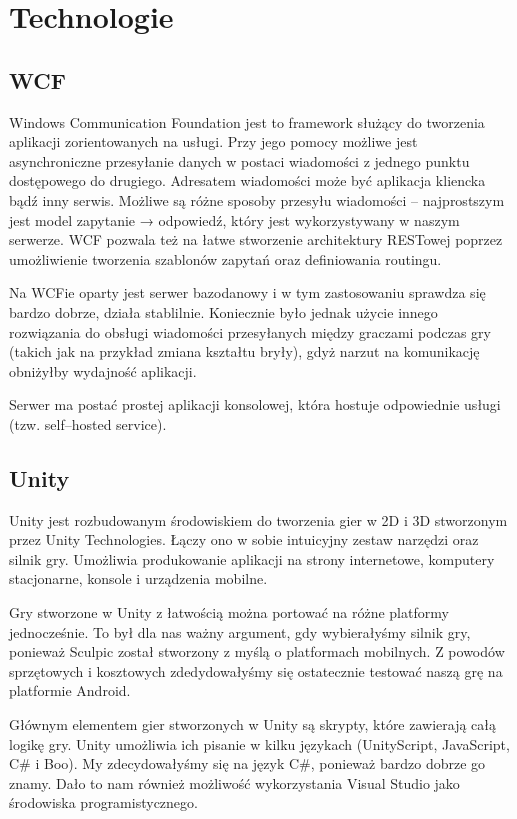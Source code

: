 \chapter{Technologie}
\section{WCF}
Windows Communication Foundation jest to framework służący do tworzenia aplikacji zorientowanych na usługi. Przy jego pomocy możliwe jest asynchroniczne przesyłanie danych w postaci wiadomości z jednego punktu dostępowego do drugiego. Adresatem wiadomości może być aplikacja kliencka bądź inny serwis. Możliwe są różne sposoby przesyłu wiadomości – najprostszym jest model zapytanie → odpowiedź, który jest wykorzystywany w naszym serwerze. WCF pozwala też na łatwe stworzenie architektury RESTowej poprzez umożliwienie tworzenia szablonów zapytań oraz definiowania routingu.

Na WCFie oparty jest serwer bazodanowy i w tym zastosowaniu sprawdza się bardzo dobrze, działa stablilnie. Koniecznie było jednak użycie innego rozwiązania do obsługi wiadomości przesyłanych między graczami podczas gry (takich jak na przykład zmiana kształtu bryły), gdyż narzut na komunikację obniżyłby wydajność aplikacji.

Serwer ma postać prostej aplikacji konsolowej, która hostuje odpowiednie usługi (tzw. self–hosted service).

\section{Unity}
Unity jest rozbudowanym środowiskiem do tworzenia gier w 2D i 3D stworzonym przez Unity Technologies. Łączy ono w sobie intuicyjny zestaw narzędzi oraz silnik gry. Umożliwia produkowanie aplikacji na strony internetowe, komputery stacjonarne, konsole i urządzenia mobilne.

Gry stworzone w Unity z łatwością można portować na różne platformy jednocześnie. To był dla nas ważny argument, gdy wybierałyśmy silnik gry, ponieważ Sculpic został stworzony z myślą o platformach mobilnych. Z powodów sprzętowych i kosztowych zdedydowałyśmy się ostatecznie testować naszą grę na platformie Android.

Głównym elementem gier stworzonych w Unity są skrypty, które zawierają całą logikę gry. Unity umożliwia ich pisanie w kilku językach (UnityScript, JavaScript, C{\#} i Boo). My zdecydowałyśmy się na język C{\#}, ponieważ bardzo dobrze go znamy. Dało to nam również możliwość wykorzystania Visual Studio jako środowiska programistycznego.

